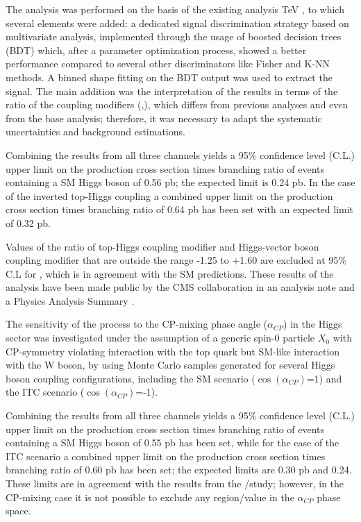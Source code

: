 The analysis was performed on the basis of the existing analysis  TeV \cite{CMS_AN_2017-029}, to which several elements were added: a dedicated signal discrimination strategy based on multivariate analysis, implemented through the usage of boosted decision trees (BDT) which, after a parameter optimization process, showed a better performance compared to several other discriminators like Fisher and K-NN methods. A binned shape fitting on the BDT output was used to extract the signal. The main addition was the interpretation of the results in terms of the ratio of the coupling modifiers (\Ct,\CV), which differs from previous \tH analyses and even from the base \ttH analysis; therefore, it was necessary to adapt the systematic uncertainties and background estimations.

Combining the results from all three channels yields a 95\% confidence level (C.L.) upper limit on the production cross section times branching ratio of events containing a SM Higgs boson of 0.56 pb; the expected limit is 0.24 pb. In the case of the inverted top-Higgs coupling a combined upper limit on the production cross section times branching ratio of 0.64 pb has been set with an expected limit of 0.32 pb.  

Values of the ratio of top-Higgs coupling modifier \Ct and Higgs-vector boson coupling modifier \CV that are outside the range -1.25 to +1.60 are excluded at 95\% C.L for , which is in agreement with the SM predictions. These results of the analysis have been made public by the CMS collaboration in an analysis note \cite{CMS_AN_2016-378} and a Physics Analysis Summary \cite{CMS_PAS_HIG_17-005}.

The sensitivity of the \tH process to the CP-mixing phase angle ($\alpha_{CP}$) in the Higgs sector was investigated under the assumption of a generic spin-0 particle $X_0$ with CP-symmetry violating interaction with the top quark but SM-like interaction with the W boson, by using Monte Carlo samples generated for several Higgs boson coupling configurations, including the SM scenario ($\cos(\alpha_{CP})$=1) and the ITC scenario ($\cos (\alpha_{CP})$=-1).  

Combining the results from all three channels yields a 95\% confidence level (C.L.) upper limit on the production cross section times branching ratio of events containing a SM Higgs boson of 0.55 pb has been set, while for the case of the ITC scenario a combined upper limit on the production cross section times branching ratio of 0.60 pb has been set; the expected limits are 0.30 pb and 0.24. These limits are in agreement with the results from the \Ct/\CV study; however, in the CP-mixing case it is not possible to exclude any region/value in the $\alpha_{CP}$ phase space.

